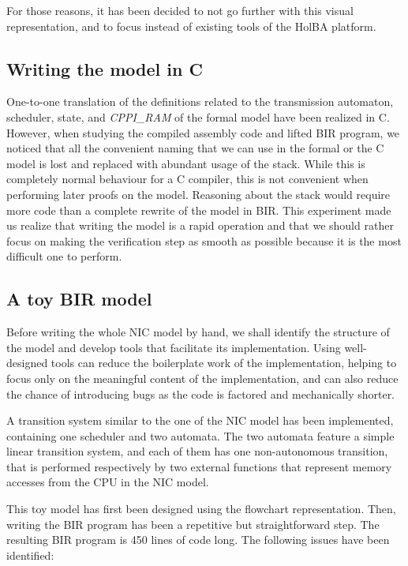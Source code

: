 \documentclass[10pt,a4paper]{article}
\begin{document}
\begin{multicols}{2}
For those reasons, it has been decided to not go further with this visual representation, and to focus instead of existing tools of the HolBA platform.

\subsection{Writing the model in C} \label{c-model}

One-to-one translation of the definitions related to the transmission automaton, scheduler, state, and \textit{CPPI\_RAM} of the formal model have been realized in C. However, when studying the compiled assembly code and lifted BIR program, we noticed that all the convenient naming that we can use in the formal or the C model is lost and replaced with abundant usage of the stack. While this is completely normal behaviour for a C compiler, this is not convenient when performing later proofs on the model. Reasoning about the stack would require more code than a complete rewrite of the model in BIR. This experiment made us realize that writing the model is a rapid operation and that we should rather focus on making the verification step as smooth as possible because it is the most difficult one to perform.

\subsection{A toy BIR model} \label{alice-bob-toy}

Before writing the whole NIC model by hand, we shall identify the structure of the model and develop tools that facilitate its implementation. Using well-designed tools can reduce the boilerplate work of the implementation, helping to focus only on the meaningful content of the implementation, and can also reduce the chance of introducing bugs as the code is factored and mechanically shorter.

A transition system similar to the one of the NIC model has been implemented, containing one scheduler and two automata. The two automata feature a simple linear transition system, and each of them has one non-autonomous transition, that is performed respectively by two external functions that represent memory accesses from the CPU in the NIC model.

This toy model has first been designed using the flowchart representation. Then, writing the BIR program has been a repetitive but straightforward step. The resulting BIR program is \num{450} lines of code long. The following issues have been identified:


\end{multicols}
\end{document}
